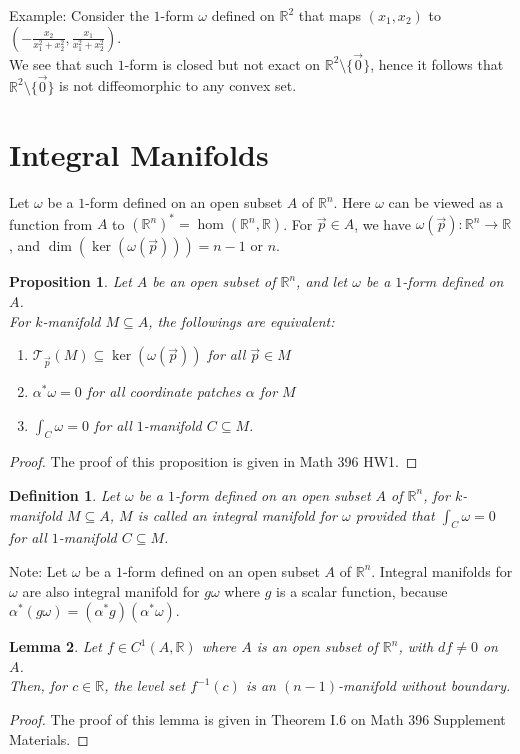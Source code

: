 \documentclass[15pt]{book}
\theoremstyle{break}
\theoremstyle{break}
\newtheorem{lem}{Lemma}[thm]
\newtheorem{prop}[lem]{Proposition}
\newtheorem{defn}{Definition}[corL]
\newcommand{\R}{\mathbb{R}}
\newcommand{\T}{\mathcal{T}}
\newcommand{\note}{\color{red}Note: \color{black}}
\newcommand{\example}{\color{green}Example: \color{black}}
\begin{document}
\example Consider the $1$-form $\omega $ defined on $\R^2$ that maps $(x_1,x_2)$ to $(-\frac{x_2}{x_1^2+x_2^2} , \frac{x_1}{x_1^2+x_2^2})$.\\
We see that such $1$-form is closed but not exact on $\R^2 \setminus \{\vec{0}\}$, hence it follows that $\R^2 \setminus \{\vec{0}\}$ is not diffeomorphic to any convex set. 


\newpage
\section[Integral Manifolds]{\color{red}Integral Manifolds \color{black}}
Let $\omega$ be a $1$-form defined on an open subset $A$ of $\R^n$. Here $\omega$ can be viewed as a function from $A$ to $(\R^n)^* = \hom(\R^n, \R)$. For $\vec{p}\in A$, we have $\omega(\vec{p}):\R^n \to \R$, and $\dim(\ker(\omega(\vec{p}))) = n-1$ or $n$. 
\begin{prop}
Let $A$ be an open subset of $\R^n$, and let $\omega$ be a $1$-form defined on $A$. \\
For $k$-manifold $M\subseteq A$, the followings are equivalent:
\begin{enumerate}[topsep=3pt,itemsep=-1ex,partopsep=1ex,parsep=1ex]
\item $\T_{\vec{p}}(M) \subseteq \ker(\omega(\vec{p}))$ for all $\vec{p}\in M$
\item $\alpha^*\omega = 0$ for all coordinate patches $\alpha$ for $M$
\item $\int_C \omega =0$ for all $1$-manifold $C\subseteq M$. 
\end{enumerate} 
\end{prop}
\begin{proof}
The proof of this proposition is given in Math 396 HW1. 
\end{proof}

\begin{defn}
Let $\omega$ be a $1$-form defined on an open subset $A$ of $\R^n$, for $k$-manifold $M \subseteq A$, $M$ is called an integral manifold for $\omega$ provided that $\int_C \omega =0$ for all $1$-manifold $C\subseteq M$. 
\end{defn}

\note Let $\omega$ be a $1$-form defined on an open subset $A$ of $\R^n$. Integral manifolds for $\omega$ are also integral manifold for $g\omega$ where $g$ is a scalar function, because $\alpha^*(g\omega) = (\alpha^*g)(\alpha^*\omega)$.

\begin{lem}
Let $f \in C^1(A,\R)$ where $A$ is an open subset of $\R^n$, with $df \neq 0$ on $A$. \\Then, for $c \in \R$, the level set $f^{-1}(c)$ is an $(n-1)$-manifold without boundary.
\end{lem}
\begin{proof}
The proof of this lemma is given in Theorem I.6 on Math 396 Supplement Materials. 
\end{proof}
\end{document}
